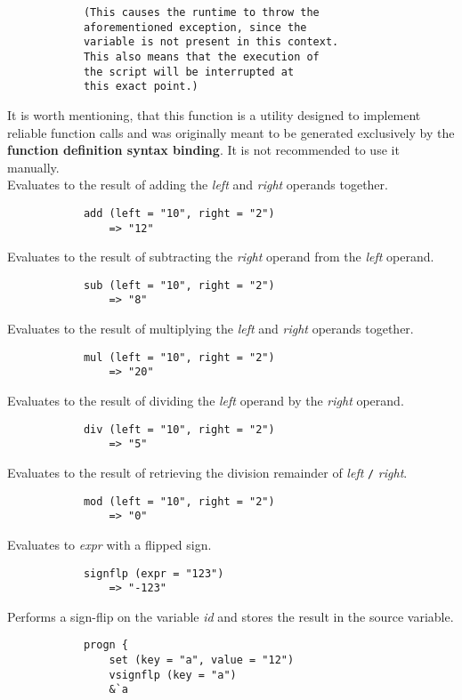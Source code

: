 \begin{multicols*}{2}
\begin{verbatim}
			(This causes the runtime to throw the
			aforementioned exception, since the
			variable is not present in this context.
			This also means that the execution of
			the script will be interrupted at
			this exact point.)
    \end{verbatim}
    It is worth mentioning, that this function is a utility designed to implement reliable function calls and was originally meant
    to be generated exclusively by the \textbf{function definition syntax binding}. It is not recommended to use it manually.\\[3mm]
    Evaluates to the result of adding the \textit{left} and \textit{right} operands together.
    \begin{verbatim}
			add (left = "10", right = "2")
			    => "12"
    \end{verbatim}
    Evaluates to the result of subtracting the \textit{right} operand from the \textit{left} operand.
    \begin{verbatim}
			sub (left = "10", right = "2")
			    => "8"
    \end{verbatim}
    Evaluates to the result of multiplying the \textit{left} and \textit{right} operands together.
    \begin{verbatim}
			mul (left = "10", right = "2")
			    => "20"
    \end{verbatim}
    Evaluates to the result of dividing the \textit{left} operand by the \textit{right} operand.
    \begin{verbatim}
			div (left = "10", right = "2")
			    => "5"
    \end{verbatim}
    Evaluates to the result of retrieving the division remainder of \textit{left} \verb|/| \textit{right}.
    \begin{verbatim}
			mod (left = "10", right = "2")
			    => "0"
    \end{verbatim}
    Evaluates to \textit{expr} with a flipped sign.
    \begin{verbatim}
			signflp (expr = "123")
			    => "-123"
    \end{verbatim}
	\columnbreak
    Performs a sign-flip on the variable \textit{id} and stores the result in the source variable.
    \begin{verbatim}
			progn {
			    set (key = "a", value = "12")
			    vsignflp (key = "a")
			    &`a

\end{verbatim}
\end{multicols*}
